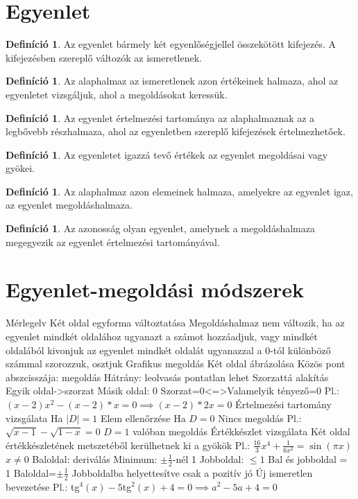 \documentclass[twoside,12pt]{report}
\theoremstyle{definition}
\newtheorem{definition}[theorem]{Definíció}
\begin{document}
\section{Egyenlet}
	\begin{definition}
		Az egyenlet bármely két egyenlőségjellel összekötött kifejezés. A kifejezésben szereplő
		változók az ismeretlenek.
	\end{definition}
	\begin{definition}
		Az alaphalmaz az ismeretlenek azon értékeinek halmaza, ahol az egyenletet vizsgáljuk,
		ahol a megoldásokat keressük.
	\end{definition}
	\begin{definition}
		Az egyenlet értelmezési tartománya az alaphalmaznak az a legbővebb részhalmaza,
		ahol az egyenletben szereplő kifejezések értelmezhetőek.
	\end{definition}
	\begin{definition}
		Az egyenletet igazzá tevő értékek az egyenlet megoldásai vagy gyökei.
	\end{definition}
	\begin{definition}
		Az alaphalmaz azon elemeinek halmaza, amelyekre az egyenlet igaz, az egyenlet megoldáshalmaza.
	\end{definition}
	\begin{definition}
		Az azonosság olyan egyenlet, amelynek a megoldáshalmaza megegyezik az egyenlet
		értelmezési tartományával.
	\end{definition}
\pagebreak
\section{Egyenlet-megoldási módszerek}
	\begin{outline}[enumerate]
		\1 Mérlegelv
			\2 Két oldal egyforma változtatása
			\2 Megoldáshalmaz nem változik, ha
				\3 az egyenlet mindkét oldalához ugyanazt a számot hozzáadjuk, vagy mindkét oldalából kivonjuk
				\3 az egyenlet mindkét oldalát ugyanazzal a 0-tól különböző számmal szorozzuk, osztjuk
		\1 Grafikus megoldás
			\2 Két oldal ábrázolása
			\2 Közös pont abszcisszája: megoldás
			\2 Hátrány: leolvasás pontatlan lehet
		\1 Szorzattá alakítás
			\2 Egyik oldal->szorzat
			\2 Másik oldal: 0
			\2 Szorzat=0<=>Valamelyik tényező=0
			\2 Pl.:$(x-2)x^2-(x-2)*x=0\implies(x-2)*2x=0$
		\1 Értelmezési tartomány vizsgálata
			\2 Ha $|D|=1$
				\3 Elem ellenőrzése
			\2 Ha $D=0$
				\3 Nincs megoldás
			\2 Pl.: $\sqrt{x-1}-\sqrt{1-x}=0$
				\3 $D={1}$
				 valóban megoldás
		\1 Értékkészlet vizsgálata
			\2 Két oldal értékkészletének metszetéből kerülhetnek ki a gyökök
			\2 Pl.:	$\frac{16}{3}x^4+\frac{1}{6x^2}=\sin(\pi x)$
				\3 $x\ne0$
				\3 Baloldal: deriválás
					\4 Minimum: $\pm\frac{1}{2}$-nél 1
				\3 Jobboldal: $\le1$
				\3 Bal és jobboldal = 1
				\3 Baloldal=$\pm\frac{1}{2}$
				\3 Jobboldalba helyettesítve csak a pozitív jó
		\1 Új ismeretlen bevezetése
			\2 Pl.: tg$^4(x)-5$tg$^2(x)+4=0\implies a^2-5a+4=0$
	\end{outline}
\end{document}
